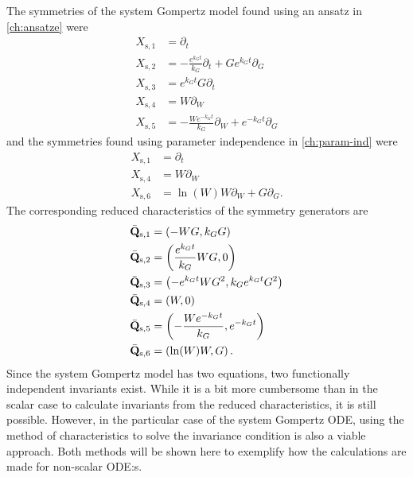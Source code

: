 The symmetries of the system Gompertz model found using an ansatz in \cref{ch:ansatze} were
\begin{align}
  X_{\text{s},1} &= \partial_t \\
  X_{\text{s},2} &= - \frac{e^{k_{G} t}}{k_{G}} \partial_t + G e^{k_{G} t} \partial_G \\
  X_{\text{s},3} &= e^{k_{G} t} G \partial_t \\
  X_{\text{s},4} &= W \partial_W \\
  X_{\text{s},5} &= - \frac{W e^{- k_{G} t}}{k_{G}} \partial_W + e^{- k_{G} t} \partial_G
\end{align}
and the symmetries found using parameter independence in \cref{ch:param-ind} were
\begin{align}
  X_{\text{s},1} &= \partial_t \\
  X_{\text{s},4} &= W \partial_W \\
  X_{\text{s},6} &= \ln(W) W \partial_W + G \partial_G.
\end{align}
The corresponding reduced characteristics of the symmetry generators are
\begin{align}
  \bar{\vb{Q}}_{\text{s},1} &= \left(-W G, k_G G\right) \\
  \bar{\vb{Q}}_{\text{s},2} &= \left(\frac{e^{k_{G} t}}{k_{G}} W G, 0\right) \\
  \bar{\vb{Q}}_{\text{s},3} &= \left(- e^{k_{G} t} W G^2, k_G e^{k_{G} t} G^2\right) \\
  \bar{\vb{Q}}_{\text{s},4} &= \left(W, 0\right) \\
  \bar{\vb{Q}}_{\text{s},5} &= \left(- \frac{W e^{- k_{G} t}}{k_{G}}, e^{- k_{G} t} \right) \\
  \bar{\vb{Q}}_{\text{s},6} &= \left(\ln(W) W, G\right).
\end{align}
Since the system Gompertz model has two equations, two functionally independent invariants exist.
While it is a bit more cumbersome than in the scalar case to calculate invariants from the reduced characteristics, it is still possible.
However, in the particular case of the system Gompertz ODE, using the method of characteristics to solve the invariance condition is also a viable approach.
Both methods will be shown here to exemplify how the calculations are made for non-scalar ODE:s.

